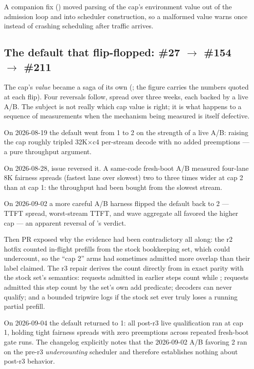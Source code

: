 A
companion fix () moved parsing of the cap's environment value out
of the admission loop and into scheduler construction, so a malformed value
warns once instead of crashing scheduling after traffic arrives.

\subsection{The default that flip-flopped: \#27 \texorpdfstring{$\rightarrow$}{->} \#154 \texorpdfstring{$\rightarrow$}{->} \#211}

The cap's \emph{value} became a saga of its own (;
the figure carries the numbers quoted at each flip). Four reversals follow,
spread over three weeks, each backed by a live A/B. The subject is not really
which cap value is right; it is what happens to a sequence of measurements
when the mechanism being measured is itself defective.

On 2026-08-19 the default went from 1 to 2 on the strength of a live A/B:
raising the cap roughly tripled 32K$\times$c4 per-stream decode with no
added preemptions --- a pure throughput argument.

On 2026-08-28, issue  reversed it. A same-code fresh-boot A/B
measured four-lane 8K fairness spreads (fastest lane over slowest) two to
three times wider at cap 2 than at cap 1: the throughput had been bought
from the slowest stream.

On 2026-09-02 a more careful A/B harness flipped the default back to 2 ---
TTFT spread, worst-stream TTFT, and wave aggregate all favored the higher
cap --- an apparent reversal of 's verdict.

Then PR  exposed why the evidence had been contradictory all
along: the r2 hotfix counted in-flight prefills from the stock
 bookkeeping set, which could undercount, so the
``cap 2'' arms had sometimes admitted more overlap than their label claimed.
The r3 repair derives the count directly from  in exact
parity with the stock set's semantics: requests admitted in earlier steps
count while ; requests
admitted this step count by the set's own add predicate; decoders can never
qualify; and a bounded tripwire logs if the stock set ever truly loses a
running partial prefill.

On 2026-09-04 the default returned to 1: all post-r3 live qualification ran
at cap 1, holding tight fairness spreads with zero preemptions across
repeated fresh-boot gate runs. The changelog explicitly notes that
the 2026-09-02 A/B favoring 2 ran on the pre-r3 \emph{undercounting}
scheduler and therefore establishes nothing about post-r3 behavior.

